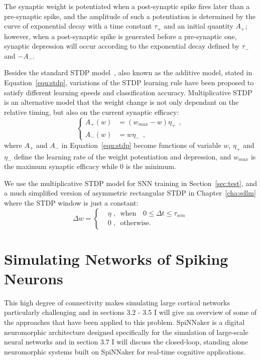 The synaptic weight is potentiated when a post-synaptic spike fires later than a pre-synaptic spike, and the amplitude of such a potentiation is determined by the curve of exponential decay with a time constant $\tau_+$ and an initial quantity $A_+$;
however, when a post-synaptic spike is generated before a pre-synaptic one, synaptic depression will occur according to the exponential decay defined by $\tau_-$ and $-A_-$.

Besides the standard STDP model~\cite{song2000competitive}, also known as the additive model, stated in Equation~\ref{equ:stdp}, variations of the STDP learning rule have been proposed to satisfy different learning speeds and classification accuracy.
Multiplicative STDP~\cite{morrison2008phenomenological} is an alternative model that the weight change is not only dependant on the relative timing, but also on the current synaptic efficacy:
\begin{equation}
\left\{
\begin{aligned}
A_+ (w) &=  (w_{max} - w)\eta_+~~, \\
A_- (w) &= w\eta_-~~,
\end{aligned}
\right.
\end{equation}
where $A_+$ and $A_-$ in Equation~\ref{equ:stdp} become functions of variable 
$w$, $\eta_+$ and $\eta_-$ define the learning rate of the weight potentiation and depression, and $w_{max}$ is the maximum synaptic efficacy while 0 is the minimum.

We use the multiplicative STDP model for SNN training in Section~\ref{sec:test}, and a much simplified version of asymmetric rectangular STDP in Chapter~\ref{cha:sdlm} where the STDP window is just a constant:
\begin{equation}
\Delta w = \left\{
\begin{aligned}
&\eta \textrm{~,~~when~~~} 0 \leq \Delta  t \leq \tau_{win}\\
& 0 \textrm{~,~~otherwise}.
\end{aligned}
\right.
\end{equation}

\section{Simulating Networks of Spiking Neurons}
\label{sec:snn_sim}
This high degree of connectivity makes simulating large cortical networks particularly challenging and in sections 3.2 - 3.5 I will give an overview of some of the approaches that have been applied to this problem.
SpiNNaker is a digital neuromorphic architecture designed specifically for the simulation of large-scale neural networks and in section 3.7 I will discuss the closed-loop, standing alone neuromorphic systems built on SpiNNaker for real-time cognitive applications.

